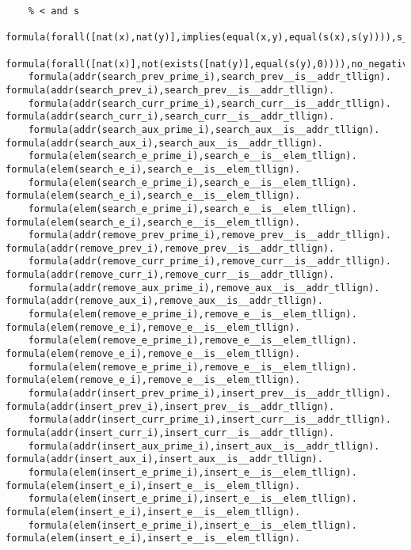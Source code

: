 \begin{lstlisting}
    % < and s 
    formula(forall([nat(x),nat(y)],implies(equal(x,y),equal(s(x),s(y)))),s_injective_tllign).
    formula(forall([nat(x)],not(exists([nat(y)],equal(s(y),0)))),no_negative_numbers_tllign).
    formula(addr(search_prev_prime_i),search_prev__is__addr_tllign).    formula(addr(search_prev_i),search_prev__is__addr_tllign).  
    formula(addr(search_curr_prime_i),search_curr__is__addr_tllign).    formula(addr(search_curr_i),search_curr__is__addr_tllign).  
    formula(addr(search_aux_prime_i),search_aux__is__addr_tllign).  formula(addr(search_aux_i),search_aux__is__addr_tllign).    
    formula(elem(search_e_prime_i),search_e__is__elem_tllign).  formula(elem(search_e_i),search_e__is__elem_tllign).    
    formula(elem(search_e_prime_i),search_e__is__elem_tllign).  formula(elem(search_e_i),search_e__is__elem_tllign).    
    formula(elem(search_e_prime_i),search_e__is__elem_tllign).  formula(elem(search_e_i),search_e__is__elem_tllign).    
    formula(addr(remove_prev_prime_i),remove_prev__is__addr_tllign).    formula(addr(remove_prev_i),remove_prev__is__addr_tllign).  
    formula(addr(remove_curr_prime_i),remove_curr__is__addr_tllign).    formula(addr(remove_curr_i),remove_curr__is__addr_tllign).  
    formula(addr(remove_aux_prime_i),remove_aux__is__addr_tllign).  formula(addr(remove_aux_i),remove_aux__is__addr_tllign).    
    formula(elem(remove_e_prime_i),remove_e__is__elem_tllign).  formula(elem(remove_e_i),remove_e__is__elem_tllign).    
    formula(elem(remove_e_prime_i),remove_e__is__elem_tllign).  formula(elem(remove_e_i),remove_e__is__elem_tllign).    
    formula(elem(remove_e_prime_i),remove_e__is__elem_tllign).  formula(elem(remove_e_i),remove_e__is__elem_tllign).    
    formula(addr(insert_prev_prime_i),insert_prev__is__addr_tllign).    formula(addr(insert_prev_i),insert_prev__is__addr_tllign).  
    formula(addr(insert_curr_prime_i),insert_curr__is__addr_tllign).    formula(addr(insert_curr_i),insert_curr__is__addr_tllign).  
    formula(addr(insert_aux_prime_i),insert_aux__is__addr_tllign).  formula(addr(insert_aux_i),insert_aux__is__addr_tllign).    
    formula(elem(insert_e_prime_i),insert_e__is__elem_tllign).  formula(elem(insert_e_i),insert_e__is__elem_tllign).    
    formula(elem(insert_e_prime_i),insert_e__is__elem_tllign).  formula(elem(insert_e_i),insert_e__is__elem_tllign).    
    formula(elem(insert_e_prime_i),insert_e__is__elem_tllign).  formula(elem(insert_e_i),insert_e__is__elem_tllign).    



\end{lstlisting}
